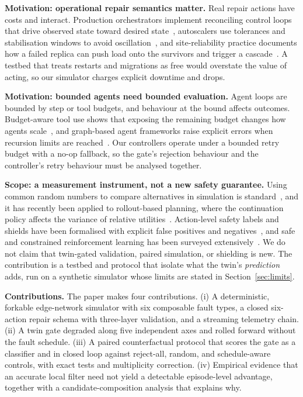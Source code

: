 \documentclass[conference]{IEEEtran}
\begin{document}
\textbf{Motivation: operational repair semantics matter.} Real repair actions have costs and interact. Production orchestrators implement reconciling control loops that drive observed state toward desired state~\cite{k8scontroller}, autoscalers use tolerances and stabilisation windows to avoid oscillation~\cite{k8shpa}, and site-reliability practice documents how a failed replica can push load onto the survivors and trigger a cascade~\cite{sre_cascade}. A testbed that treats restarts and migrations as free would overstate the value of acting, so our simulator charges explicit downtime and drops.

\textbf{Motivation: bounded agents need bounded evaluation.} Agent loops are bounded by step or tool budgets, and behaviour at the bound affects outcomes. Budget-aware tool use shows that exposing the remaining budget changes how agents scale~\cite{budgetaware}, and graph-based agent frameworks raise explicit errors when recursion limits are reached~\cite{langgraph}. Our controllers operate under a bounded retry budget with a no-op fallback, so the gate's rejection behaviour and the controller's retry behaviour must be analysed together.

\textbf{Scope: a measurement instrument, not a new safety guarantee.} Using common random numbers to compare alternatives in simulation is standard~\cite{crn}, and it has recently been applied to rollout-based planning, where the continuation policy affects the variance of relative utilities~\cite{yadav}. Action-level safety labels and shields have been formalised with explicit false positives and negatives~\cite{rulebasedshield}, and safe and constrained reinforcement learning has been surveyed extensively~\cite{saferlsurvey}. We do not claim that twin-gated validation, paired simulation, or shielding is new. The contribution is a testbed and protocol that isolate what the twin's \emph{prediction} adds, run on a synthetic simulator whose limits are stated in Section~\ref{sec:limits}.

\textbf{Contributions.} The paper makes four contributions. (i) A deterministic, forkable edge-network simulator with six composable fault types, a closed six-action repair schema with three-layer validation, and a streaming telemetry chain. (ii) A twin gate degraded along five independent axes and rolled forward without the fault schedule. (iii) A paired counterfactual protocol that scores the gate as a classifier and in closed loop against reject-all, random, and schedule-aware controls, with exact tests and multiplicity correction. (iv) Empirical evidence that an accurate local filter need not yield a detectable episode-level advantage, together with a candidate-composition analysis that explains why.
\end{document}
